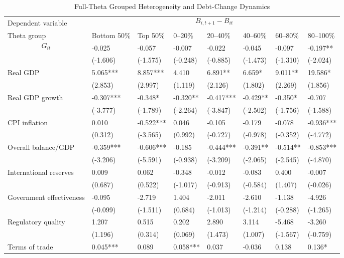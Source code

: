 \begin{table}[H]\centering
\begin{threeparttable}
\caption{Full-Theta Grouped Heterogeneity and Debt-Change Dynamics}
\label{tab:theta_group_heterogeneity_debt}
\scriptsize
\begin{tabularx}{\textwidth}{lYYYYYYY}
\toprule
Dependent variable &  \\
\cmidrule(lr){2-8}
Theta group & Bottom 50\% & Top 50\% & 0--20\% & 20--40\% & 40--60\% & 60--80\% & 80--100\% \\
\midrule
$$G_{it}$$ & -0.025 & -0.057 & -0.007 & -0.022 & -0.045 & -0.097 & -0.197** \\
  & (-1.606) & (-1.575) & (-0.248) & (-0.885) & (-1.473) & (-1.310) & (-2.024) \\
Real GDP & 5.065*** & 8.857*** & 4.410 & 6.891** & 6.659* & 9.011** & 19.586* \\
  & (2.853) & (2.997) & (1.119) & (2.126) & (1.802) & (2.269) & (1.856) \\
Real GDP growth & -0.307*** & -0.348* & -0.320** & -0.417*** & -0.429** & -0.350* & -0.707 \\
  & (-3.777) & (-1.789) & (-2.264) & (-3.847) & (-2.502) & (-1.756) & (-1.588) \\
CPI inflation & 0.010 & -0.522*** & 0.046 & -0.105 & -0.179 & -0.078 & -0.936*** \\
  & (0.312) & (-3.565) & (0.992) & (-0.727) & (-0.978) & (-0.352) & (-4.772) \\
Overall balance/GDP & -0.359*** & -0.606*** & -0.185 & -0.444*** & -0.391** & -0.514** & -0.853*** \\
  & (-3.206) & (-5.591) & (-0.938) & (-3.209) & (-2.065) & (-2.545) & (-4.870) \\
International reserves & 0.009 & 0.062 & -0.348 & -0.012 & -0.083 & 0.400 & -0.007 \\
  & (0.687) & (0.522) & (-1.017) & (-0.913) & (-0.584) & (1.407) & (-0.026) \\
Government effectiveness & -0.095 & -2.719 & 1.404 & -2.011 & -2.610 & -1.138 & -4.926 \\
  & (-0.099) & (-1.511) & (0.684) & (-1.013) & (-1.214) & (-0.288) & (-1.265) \\
Regulatory quality & 1.207 & 0.515 & 0.202 & 2.890 & 3.114 & -5.468 & -3.260 \\
  & (1.196) & (0.314) & (0.069) & (1.473) & (1.007) & (-1.567) & (-0.759) \\
Terms of trade & 0.045*** & 0.089 & 0.058*** & 0.037 & -0.036 & 0.138 & 0.136* \\

\end{tabularx}
\end{threeparttable}
\end{table}
